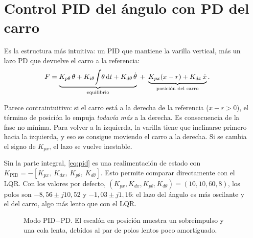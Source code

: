 \section{Control PID del ángulo con PD del carro}
\label{sec:pid}

Es la estructura más intuitiva: un PID que mantiene la varilla vertical, más un lazo PD que devuelve el carro a la referencia:
\begin{equation}
F = \underbrace{K_{p\theta}\,\theta + K_{i\theta}\!\int\!\theta\,\mathrm{d} t + K_{d\theta}\,\dot{\theta}}_{\text{equilibrio}}
  \;+\; \underbrace{K_{px}(x-r) + K_{dx}\,\dot{x}}_{\text{posición del carro}} .
\label{eq:pid}
\end{equation}

\begin{aviso}[title={¿Por qué $K_{px}>0$?}]
Parece contraintuitivo: si el carro está a la derecha de la referencia ($x-r>0$), el término de posición lo empuja \emph{todavía más} a la derecha. Es consecuencia de la fase no mínima. Para volver a la izquierda, la varilla tiene que inclinarse primero hacia la izquierda, y eso se consigue moviendo el carro a la derecha. Si se cambia el signo de $K_{px}$, el lazo se vuelve inestable.
\end{aviso}

Sin la parte integral, \eqref{eq:pid} es una realimentación de estado con $K_{\text{PID}}=-[K_{px},\ K_{dx},\ K_{p\theta},\ K_{d\theta}]$. Esto permite comparar directamente con el LQR. Con los valores por defecto, $(K_{px},K_{dx},K_{p\theta},K_{d\theta})=(10,10,60,8)$, los polos son $-8{,}56\pm j10{,}52$ y $-1{,}03\pm j1{,}16$: el lazo del ángulo es más oscilante y el del carro, algo más lento que con el LQR.

\begin{figure}[H]
\centering
{}
\caption{Modo PID+PD. El escalón en posición muestra un sobreimpulso y una cola lenta, debidos al par de polos lentos poco amortiguado.}
\label{fig:pid}
\end{figure}

